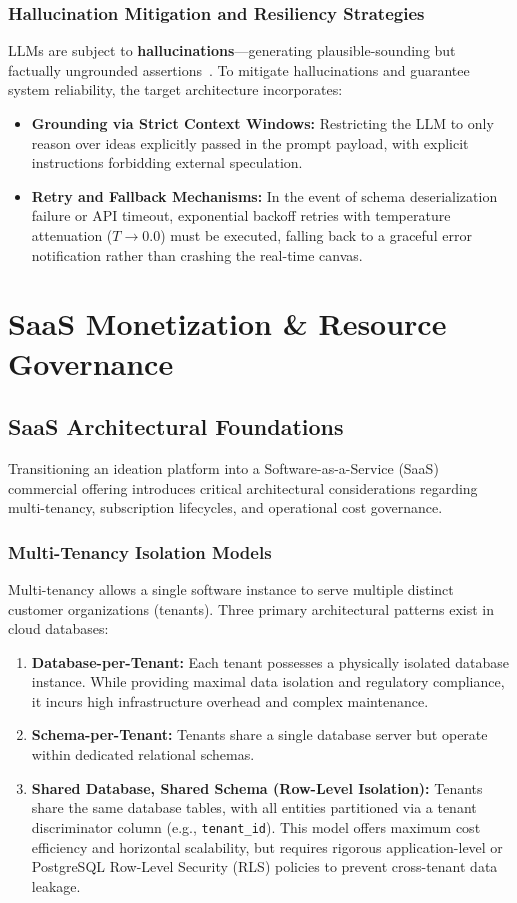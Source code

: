 \subsubsection{Hallucination Mitigation and Resiliency Strategies}
LLMs are subject to \textbf{hallucinations}---generating plausible-sounding but factually ungrounded assertions~\cite{ji2023survey}. To mitigate hallucinations and guarantee system reliability, the target architecture incorporates:
\begin{itemize}
    \item \textbf{Grounding via Strict Context Windows:} Restricting the LLM to only reason over ideas explicitly passed in the prompt payload, with explicit instructions forbidding external speculation.
    \item \textbf{Retry and Fallback Mechanisms:} In the event of schema deserialization failure or API timeout, exponential backoff retries with temperature attenuation ($T \to 0.0$) must be executed, falling back to a graceful error notification rather than crashing the real-time canvas.
\end{itemize}


\section{SaaS Monetization \& Resource Governance}
\label{sec:saas_governance}

\subsection{SaaS Architectural Foundations}
Transitioning an ideation platform into a Software-as-a-Service (SaaS) commercial offering introduces critical architectural considerations regarding multi-tenancy, subscription lifecycles, and operational cost governance.

\subsubsection{Multi-Tenancy Isolation Models}
Multi-tenancy allows a single software instance to serve multiple distinct customer organizations (tenants). Three primary architectural patterns exist in cloud databases:
\begin{enumerate}
    \item \textbf{Database-per-Tenant:} Each tenant possesses a physically isolated database instance. While providing maximal data isolation and regulatory compliance, it incurs high infrastructure overhead and complex maintenance.
    \item \textbf{Schema-per-Tenant:} Tenants share a single database server but operate within dedicated relational schemas.
    \item \textbf{Shared Database, Shared Schema (Row-Level Isolation):} Tenants share the same database tables, with all entities partitioned via a tenant discriminator column (e.g., \texttt{tenant\_id}). This model offers maximum cost efficiency and horizontal scalability, but requires rigorous application-level or PostgreSQL Row-Level Security (RLS) policies to prevent cross-tenant data leakage.
\end{enumerate}


